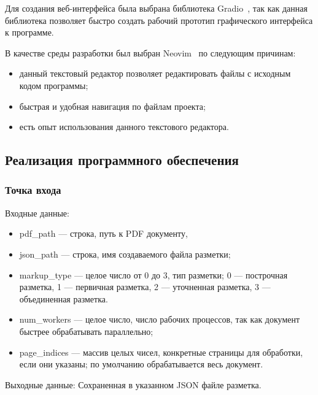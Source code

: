 Для создания веб-интерфейса была выбрана библиотека Gradio~\cite{gradio}, так как данная библиотека позволяет быстро создать рабочий прототип графического интерфейса к программе.

В качестве среды разработки был выбран Neovim~\cite{nvim} по следующим причинам:
\begin{itemize}
    \item данный текстовый редактор позволяет редактировать файлы с исходным кодом программы;
    \item быстрая и удобная навигация по файлам проекта;
    \item есть опыт использования данного текстового редактора.
\end{itemize}

\subsection{Реализация программного обеспечения}


\subsubsection{Точка входа}
Входные данные:
\begin{itemize}
    \item pdf\_path --- строка, путь к PDF документу,
    \item json\_path --- строка, имя создаваемого файла разметки;
    \item markup\_type --- целое число от 0 до 3, тип разметки; 0 --- построчная разметка, 1 --- первичная разметка, 2 --- уточненная разметка, 3 --- объединенная разметка.
    \item num\_workers --- целое число, число рабочих процессов, так как документ быстрее обрабатывать параллельно;
    \item page\_indices --- массив целых чисел, конкретные страницы для обработки, если они указаны; по умолчанию обрабатывается весь документ.
\end{itemize}

Выходные данные: Сохраненная в указанном JSON файле разметка.

